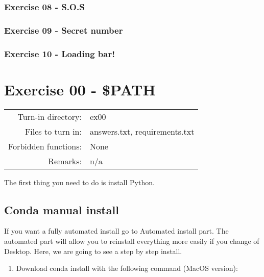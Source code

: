 \documentclass[]{article}
\providecommand{\tightlist}{%
  \setlength{\itemsep}{0pt}\setlength{\parskip}{0pt}}
\begin{document}
\hypertarget{exercise-08---s.o.s}{%
\subsubsection{Exercise 08 - S.O.S}\label{exercise-08---s.o.s}}

\hypertarget{exercise-09---secret-number}{%
\subsubsection{Exercise 09 - Secret
number}\label{exercise-09---secret-number}}

\hypertarget{exercise-10---loading-bar}{%
\subsubsection{Exercise 10 - Loading
bar!}\label{exercise-10---loading-bar}}

\clearpage

\hypertarget{exercise-00---path-1}{%
\section{Exercise 00 - \$PATH}\label{exercise-00---path-1}}

\begin{longtable}[]{@{}rl@{}}
\toprule
\endhead
Turn-in directory: & ex00\tabularnewline
Files to turn in: & answers.txt, requirements.txt\tabularnewline
Forbidden functions: & None\tabularnewline
Remarks: & n/a\tabularnewline
\bottomrule
\end{longtable}

The first thing you need to do is install Python.

\hypertarget{conda-manual-install}{%
\subsection{Conda manual install}\label{conda-manual-install}}

If you want a fully automated install go to Automated install part. The
automated part will allow you to reinstall everything more easily if you
change of Desktop. Here, we are going to see a step by step install.

\begin{enumerate}
\def\labelenumi{\arabic{enumi}.}
\tightlist
\item
  Download conda install with the following command (MacOS version):
\end{enumerate}
\end{document}
